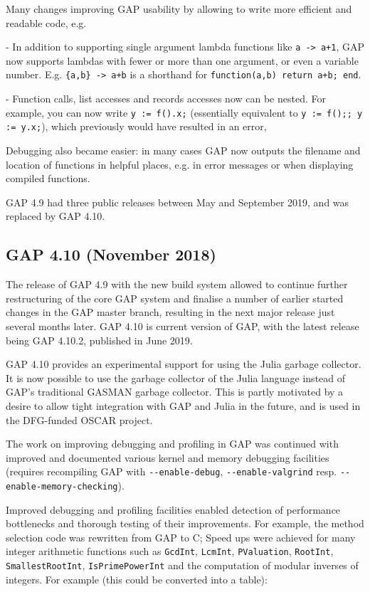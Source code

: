 \documentclass{deliverablereport}
\begin{document}
Many changes improving GAP usability by allowing to write more
efficient and readable code, e.g.

- In addition to supporting single argument lambda functions 
like \verb|a -> a+1|, GAP now supports lambdas with fewer or more 
than one argument, or even a variable number. 
E.g. \verb|{a,b} -> a+b| is a shorthand for \verb|function(a,b) return a+b; end|. %

- Function calls, list accesses and records accesses now can be nested. 
For example, you can now write \verb|y := f().x;| 
(essentially equivalent to \verb|y := f();; y := y.x;|),
which previously would have resulted in an error, %

Debugging also became easier: in many cases GAP now outputs the filename 
and location of functions in helpful places, e.g. in error messages or when 
displaying compiled functions.

GAP 4.9 had three public releases between May and September 2019, and
was replaced by GAP 4.10.

\subsection{GAP 4.10 (November 2018)}

The release of GAP 4.9 with the new build system allowed to continue
further restructuring of the core GAP system and finalise a number of
earlier started changes in the GAP master branch, resulting in the 
next major release just several months later. GAP 4.10 is current version
of GAP, with the latest release being GAP 4.10.2, published in June 2019.

GAP 4.10 provides an experimental support for using the Julia garbage collector.
It is now possible to use the garbage collector of the Julia language 
instead of GAP's traditional GASMAN garbage collector. This is partly 
motivated by a desire to allow tight integration with GAP and Julia 
in the future, and is used in the DFG-funded OSCAR project.

The work on improving debugging and profiling in GAP was continued
with improved and documented various kernel and memory debugging facilities 
(requires recompiling GAP with \verb|--enable-debug|,
\verb|--enable-valgrind| resp. \verb|--enable-memory-checking|).

Improved debugging and profiling facilities enabled detection of 
performance bottlenecks and thorough testing of their improvements.
For example, the method selection code was rewritten from GAP to C; %
Speed ups were achieved for many integer arithmetic functions such as
\verb|GcdInt|, \verb|LcmInt|, \verb|PValuation|, 
\verb|RootInt|, \verb|SmallestRootInt|, \verb|IsPrimePowerInt|
and the computation of modular inverses of integers. %
For example (this could be converted into a table):
\end{document}
